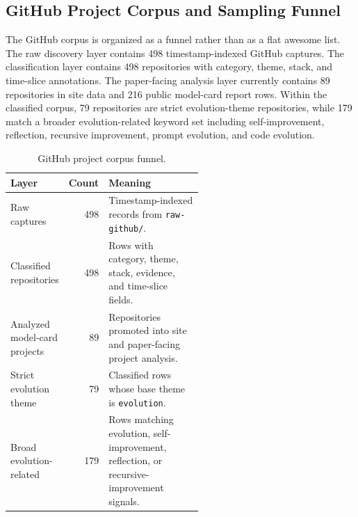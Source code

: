 
\subsection{GitHub Project Corpus and Sampling Funnel}
\label{subsec:github-project-corpus-sampling}

The GitHub corpus is organized as a funnel rather than as a flat awesome list. The raw discovery layer contains 498 timestamp-indexed GitHub captures. The classification layer contains 498 repositories with category, theme, stack, and time-slice annotations. The paper-facing analysis layer currently contains 89 repositories in site data and 216 public model-card report rows. Within the classified corpus, 79 repositories are strict evolution-theme repositories, while 179 match a broader evolution-related keyword set including self-improvement, reflection, recursive improvement, prompt evolution, and code evolution.

\begin{table}[t]
\centering
\caption{GitHub project corpus funnel.}
\label{tab:github-project-corpus-funnel}
\begin{tabular}{lrp{0.55\linewidth}}
\toprule
Layer & Count & Meaning \\
\midrule
Raw captures & 498 & Timestamp-indexed records from \texttt{raw-github/}. \\
Classified repositories & 498 & Rows with category, theme, stack, evidence, and time-slice fields. \\
Analyzed model-card projects & 89 & Repositories promoted into site and paper-facing project analysis. \\
Strict evolution theme & 79 & Classified rows whose base theme is \texttt{evolution}. \\
Broad evolution-related & 179 & Rows matching evolution, self-improvement, reflection, or recursive-improvement signals. \\
\bottomrule
\end{tabular}
\end{table}

